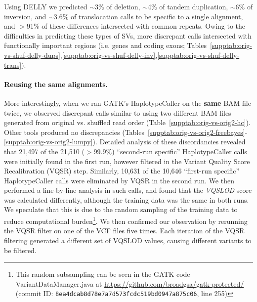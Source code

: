 \documentclass{bioinfo}
\begin{document}
Using DELLY we predicted $\sim$3\% of deletion, $\sim$4\% of tandem duplication, $\sim$6\% of inversion, and $\sim$3.6\% of translocation calls to be specific to a single alignment, and $>$91\% of these differences intersected with common repeats. Owing to the difficulties in predicting
these types of SVs, more discrepant calls intersected with functionally important regions (i.e. genes and coding exons;  Tables~\ref{supptab:orig-vs-shuf-delly-dups},\ref{supptab:orig-vs-shuf-delly-inv},\ref{supptab:orig-vs-shuf-delly-trans}).

\paragraph{Reusing the same alignments.}
More interestingly, when we ran GATK's HaplotypeCaller on the {\bf same} BAM file twice, we observed discrepant calls similar to using two different BAM files generated from original vs. shuffled read order (Table~\ref{supptab:orig-vs-orig2-hc}).
Other tools produced no discrepancies (Tables~\ref{supptab:orig-vs-orig2-freebayes}-\ref{supptab:orig-vs-orig2-lumpy}).
Detailed analysis of these discordancies revealed that  21,497 of the 21,510 ($>$99.9\%) ``second-run specific'' HaplotypeCaller calls were initially found in the first run, however filtered in the Variant Quality Score Recalibration (VQSR) step. Similarly, 10,631 of the 10,646 ``first-run specific'' HaplotypeCaller calls were eliminated by VQSR in the second run. We then performed a line-by-line analysis in such calls, and found that the {\it VQSLOD} score was calculated differently, although the training data was the same in both runs. 
We speculate that this is due to the random sampling of the training data
to reduce computational burden\footnote{This random subsampling can be seen in the GATK code VariantDataManager.java at %
\url{https://github.com/broadgsa/gatk-protected/} (commit ID: {\tt 8ea4dcab8d78e7a7d573fcdc519bd0947a875c06}, line 255)}. 
We then confirmed our observation by rerunning the VQSR filter on 
one of the VCF files five times. Each iteration of the VQSR filtering generated a different set of VQSLOD values, causing different variants to be filtered.

\end{document}
